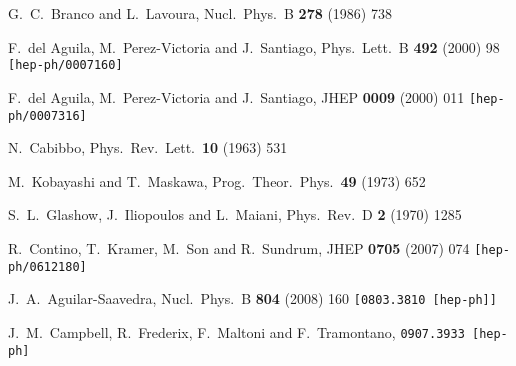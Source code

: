 \documentclass[12pt,a4paper]{article}
\begin{document}
\begin{thebibliography}{99}

  G.~C.~Branco and L.~Lavoura,
  Nucl.\ Phys.\  B {\bf 278} (1986) 738

  F.~del Aguila, M.~Perez-Victoria and J.~Santiago,
  Phys.\ Lett.\  B {\bf 492} (2000) 98
  {\tt [hep-ph/0007160]}

  F.~del Aguila, M.~Perez-Victoria and J.~Santiago,
  JHEP {\bf 0009} (2000) 011
  {\tt [hep-ph/0007316]}

  N.~Cabibbo,
  Phys.\ Rev.\ Lett.\  {\bf 10} (1963) 531

  M.~Kobayashi and T.~Maskawa,
  Prog.\ Theor.\ Phys.\  {\bf 49} (1973) 652

  S.~L.~Glashow, J.~Iliopoulos and L.~Maiani,
  Phys.\ Rev.\  D {\bf 2} (1970) 1285

  R.~Contino, T.~Kramer, M.~Son and R.~Sundrum,
  JHEP {\bf 0705} (2007) 074
  {\tt [hep-ph/0612180]}


  J.~A.~Aguilar-Saavedra,
  Nucl.\ Phys.\  B {\bf 804} (2008) 160
  {\tt [0803.3810 [hep-ph]]}

  J.~M.~Campbell, R.~Frederix, F.~Maltoni and F.~Tramontano,
  {\tt 0907.3933 [hep-ph]}


\end{thebibliography}
\end{document}
